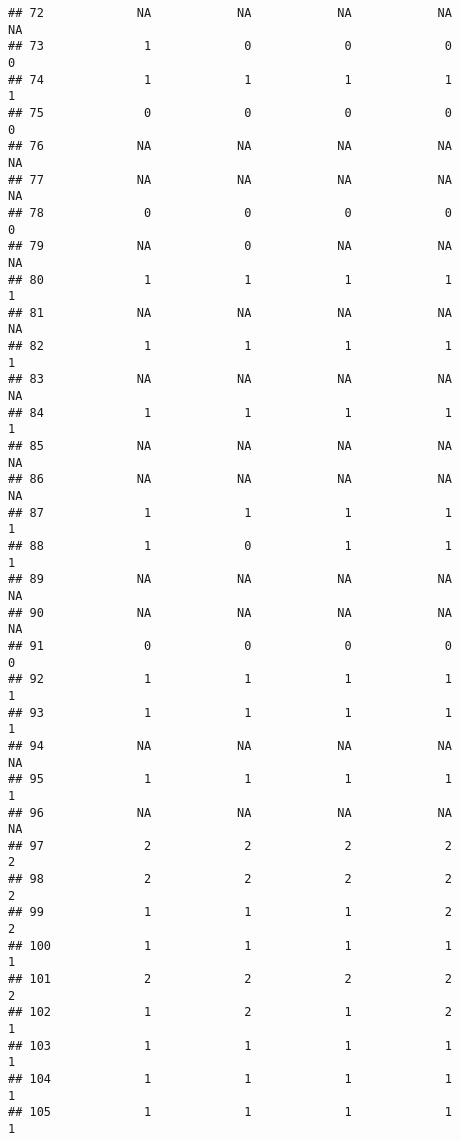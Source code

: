 \documentclass[
]{article}
\begin{document}
\begin{verbatim}
## 72             NA            NA            NA            NA            NA
## 73              1             0             0             0             0
## 74              1             1             1             1             1
## 75              0             0             0             0             0
## 76             NA            NA            NA            NA            NA
## 77             NA            NA            NA            NA            NA
## 78              0             0             0             0             0
## 79             NA             0            NA            NA            NA
## 80              1             1             1             1             1
## 81             NA            NA            NA            NA            NA
## 82              1             1             1             1             1
## 83             NA            NA            NA            NA            NA
## 84              1             1             1             1             1
## 85             NA            NA            NA            NA            NA
## 86             NA            NA            NA            NA            NA
## 87              1             1             1             1             1
## 88              1             0             1             1             1
## 89             NA            NA            NA            NA            NA
## 90             NA            NA            NA            NA            NA
## 91              0             0             0             0             0
## 92              1             1             1             1             1
## 93              1             1             1             1             1
## 94             NA            NA            NA            NA            NA
## 95              1             1             1             1             1
## 96             NA            NA            NA            NA            NA
## 97              2             2             2             2             2
## 98              2             2             2             2             2
## 99              1             1             1             2             2
## 100             1             1             1             1             1
## 101             2             2             2             2             2
## 102             1             2             1             2             1
## 103             1             1             1             1             1
## 104             1             1             1             1             1
## 105             1             1             1             1             1

\end{verbatim}
\end{document}
